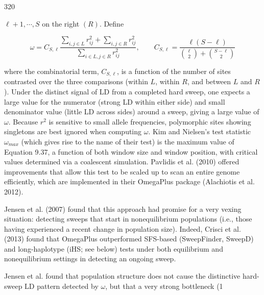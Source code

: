 \documentclass{article}
\begin{document}
320

 $ \ell + 1, \cdots, S $ on the right  $ (R) $. Define

\begin{equation}
\omega=C_{S,\ell}\frac{\sum_{i,j\in L}r_{i j}^{2}+\sum_{i,j\in R}r_{i j}^{2}}{\sum_{i\in L,j\in R}r_{i j}^{2}},\qquad C_{S,\ell}=\frac{\ell(S-\ell)}{\binom{\ell}{2}+\binom{S-\ell}{2}}
\tag{9.37}
\label{eq:9_37}
\end{equation}

where the combinatorial term,  $ C_{S,\ell} $, is a function of the number of sites contrasted over the three comparisons (within  $ L $, within  $ R $, and between  $ L $ and  $ R $). Under the distinct signal of LD from a completed hard sweep, one expects a large value for the numerator (strong LD within either side) and small denominator value (little LD across sides) around a sweep, giving a large value of  $ \omega $. Because  $ r^2 $ is sensitive to small allele frequencies, polymorphic sites showing singletons are best ignored when computing  $ \omega $. Kim and Nielsen's test statistic  $ \omega_{max} $ (which gives rise to the name of their test) is the maximum value of Equation 9.37, a function of both window size and window position, with critical values determined via a coalescent simulation. Pavlidis et al. (2010) offered improvements that allow this test to be scaled up to scan an entire genome efficiently, which are implemented in their OmegaPlus package (Alachiotis et al. 2012).

Jensen et al. (2007) found that this approach had promise for a very vexing situation: detecting sweeps that start in nonequilibrium populations (i.e., those having experienced a recent change in population size). Indeed, Crisci et al. (2013) found that OmegaPlus outperformed SFS-based (SweepFinder, SweepD) and long-haplotype (iHS; see below) tests under both equilibrium and nonequilibrium settings in detecting an ongoing sweep.

Jensen et al. found that population structure does not cause the distinctive hard-sweep LD pattern detected by  $ \omega $, but that a very strong bottleneck (1%
\end{document}
